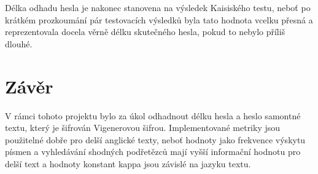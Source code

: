 \documentclass[a4paper,11pt]{article}
\begin{document}
Délka odhadu hesla je nakonec stanovena na výsledek Kaisiského testu, neboť po krátkém prozkoumání pár testovacích výsledků
byla tato hodnota vcelku přesná a reprezentovala docela věrně délku skutečného hesla, pokud to nebylo příliš dlouhé.

\section{Závěr}
V rámci tohoto projektu bylo za úkol odhadnout délku hesla a heslo samontné textu, který je šifrován Vigenerovou šifrou.
Implementované metriky jsou použitelné dobře pro delší anglické texty, neboť hodnoty jako frekvence výskytu písmen a 
vyhledávání shodných podřetězců mají vyšší informační hodnotu pro delší text a hodnoty konstant kappa jsou závislé na
jazyku textu.
\end{document}
